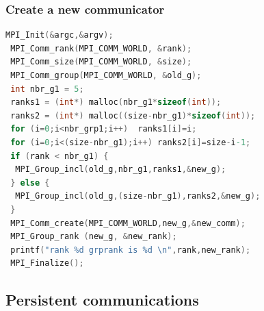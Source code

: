 \begin{frame}[containsverbatim]
\frametitle{Create a new communicator}	



\begin{lstlisting}[language=C,frame=lines]
 MPI_Init(&argc,&argv);
 MPI_Comm_rank(MPI_COMM_WORLD, &rank);
 MPI_Comm_size(MPI_COMM_WORLD, &size);
 MPI_Comm_group(MPI_COMM_WORLD, &old_g);
 int nbr_g1 = 5;
 ranks1 = (int*) malloc(nbr_g1*sizeof(int));
 ranks2 = (int*) malloc((size-nbr_g1)*sizeof(int));
 for (i=0;i<nbr_grp1;i++)  ranks1[i]=i;
 for (i=0;i<(size-nbr_g1);i++) ranks2[i]=size-i-1;
 if (rank < nbr_g1) {
  MPI_Group_incl(old_g,nbr_g1,ranks1,&new_g);
 } else {
  MPI_Group_incl(old_g,(size-nbr_g1),ranks2,&new_g);
 } 
 MPI_Comm_create(MPI_COMM_WORLD,new_g,&new_comm);
 MPI_Group_rank (new_g, &new_rank);
 printf("rank %d grprank is %d \n",rank,new_rank);
 MPI_Finalize();
\end{lstlisting}




\end{frame}


\subsection{Persistent communications}

